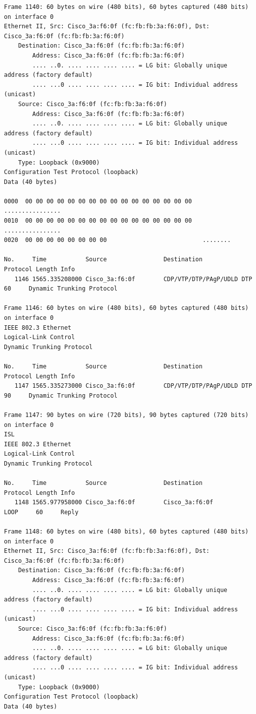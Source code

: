 \documentclass[a4paper,11pt]{article}
\begin{document}
\begin{lstlisting}
Frame 1140: 60 bytes on wire (480 bits), 60 bytes captured (480 bits) on interface 0
Ethernet II, Src: Cisco_3a:f6:0f (fc:fb:fb:3a:f6:0f), Dst: Cisco_3a:f6:0f (fc:fb:fb:3a:f6:0f)
    Destination: Cisco_3a:f6:0f (fc:fb:fb:3a:f6:0f)
        Address: Cisco_3a:f6:0f (fc:fb:fb:3a:f6:0f)
        .... ..0. .... .... .... .... = LG bit: Globally unique address (factory default)
        .... ...0 .... .... .... .... = IG bit: Individual address (unicast)
    Source: Cisco_3a:f6:0f (fc:fb:fb:3a:f6:0f)
        Address: Cisco_3a:f6:0f (fc:fb:fb:3a:f6:0f)
        .... ..0. .... .... .... .... = LG bit: Globally unique address (factory default)
        .... ...0 .... .... .... .... = IG bit: Individual address (unicast)
    Type: Loopback (0x9000)
Configuration Test Protocol (loopback)
Data (40 bytes)

0000  00 00 00 00 00 00 00 00 00 00 00 00 00 00 00 00   ................
0010  00 00 00 00 00 00 00 00 00 00 00 00 00 00 00 00   ................
0020  00 00 00 00 00 00 00 00                           ........

No.     Time           Source                Destination           Protocol Length Info
   1146 1565.335208000 Cisco_3a:f6:0f        CDP/VTP/DTP/PAgP/UDLD DTP      60     Dynamic Trunking Protocol

Frame 1146: 60 bytes on wire (480 bits), 60 bytes captured (480 bits) on interface 0
IEEE 802.3 Ethernet 
Logical-Link Control
Dynamic Trunking Protocol

No.     Time           Source                Destination           Protocol Length Info
   1147 1565.335273000 Cisco_3a:f6:0f        CDP/VTP/DTP/PAgP/UDLD DTP      90     Dynamic Trunking Protocol

Frame 1147: 90 bytes on wire (720 bits), 90 bytes captured (720 bits) on interface 0
ISL
IEEE 802.3 Ethernet 
Logical-Link Control
Dynamic Trunking Protocol

No.     Time           Source                Destination           Protocol Length Info
   1148 1565.977958000 Cisco_3a:f6:0f        Cisco_3a:f6:0f        LOOP     60     Reply

Frame 1148: 60 bytes on wire (480 bits), 60 bytes captured (480 bits) on interface 0
Ethernet II, Src: Cisco_3a:f6:0f (fc:fb:fb:3a:f6:0f), Dst: Cisco_3a:f6:0f (fc:fb:fb:3a:f6:0f)
    Destination: Cisco_3a:f6:0f (fc:fb:fb:3a:f6:0f)
        Address: Cisco_3a:f6:0f (fc:fb:fb:3a:f6:0f)
        .... ..0. .... .... .... .... = LG bit: Globally unique address (factory default)
        .... ...0 .... .... .... .... = IG bit: Individual address (unicast)
    Source: Cisco_3a:f6:0f (fc:fb:fb:3a:f6:0f)
        Address: Cisco_3a:f6:0f (fc:fb:fb:3a:f6:0f)
        .... ..0. .... .... .... .... = LG bit: Globally unique address (factory default)
        .... ...0 .... .... .... .... = IG bit: Individual address (unicast)
    Type: Loopback (0x9000)
Configuration Test Protocol (loopback)
Data (40 bytes)


\end{lstlisting}
\end{document}
